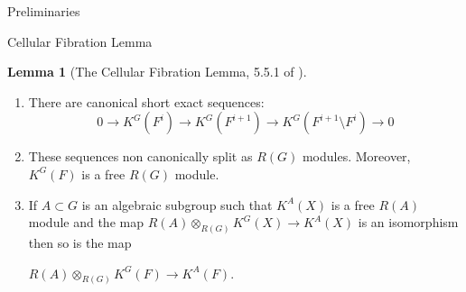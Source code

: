 \documentclass[12pt]{article}
\newcommand{\<}{\langle}
\renewcommand{\>}{\rangle}
\theoremstyle{plain}
\theoremstyle{definition}
\newtheorem{lemma}[theorem]{Lemma}
\begin{document}
\begin{section}{Preliminaries}
\begin{subsection}{Cellular Fibration Lemma}
\begin{lemma}[The Cellular Fibration Lemma, 5.5.1 of \cite{Chriss1997RepresentationTA}]
\begin{enumerate}
    \item There are canonical short exact sequences:
    $$0\rightarrow K^G(F^i)\rightarrow K^G(F^{i+1})\rightarrow K^G(F^{i+1}\setminus F^i)\rightarrow 0$$
    \item These sequences non canonically split as $R(G)$ modules. Moreover, $K^G(F)$ is a free $R(G)$ module.
    \item If $A\subset G$ is an algebraic subgroup such that $K^A(X)$ is a free $R(A)$ module and the map $R(A)\otimes_{R(G)} K^G(X)\rightarrow K^A(X)$ is an isomorphism then so is the map 
    
    $R(A)\otimes_{R(G)} K^G(F)\rightarrow K^A(F)$. 
\end{enumerate}
    
\end{lemma}
    
\end{subsection}

    
\end{section}
\end{document}
